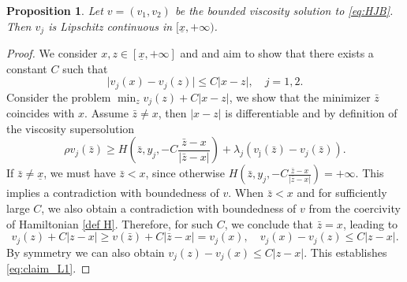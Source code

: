 \documentclass[11pt]{article}
\numberwithin{equation}{section}
\newtheorem{proposition}[theorem]{Proposition}
\theoremstyle{Claim}
\def\bjm{{\bar{\jmath}}}
\newcommand{\ux}{{\underline x}}
\theoremstyle{plain}
\begin{document}
\begin{proposition}\label{solution property}
Let $v=(v_1,v_2)$ be the bounded viscosity solution to  \eqref{eq:HJB}. Then $v_j$ is Lipschitz continuous in $[\ux,+\infty)$. 
	
\end{proposition}
\begin{proof}
We consider $x,z\in [\ux,+\infty]$ and and aim to show that there exists a constant \( C \) such that  
	\begin{equation}\label{eq:claim_L1}
		\vert v_j(x) -  v_j(z) \vert\leq C |x - z|,\quad j=1,2.
	\end{equation}
	Consider the problem $\min_{z}v_j(z)+C\vert x-z\vert$, we show that the minimizer $\bar{z}$ coincides with $x$. Assume $\bar{z}\neq x$, then $\vert x-z\vert$ is differentiable and by definition of the viscosity supersolution 
$$
	\rho v_j(\bar{z}) \geq H \left( \bar{z}, y_j, -C \frac{\bar{z} - x}{|\bar{z} - x|} \right)+\lambda_j(v_\bjm(\bar{z}) -v_j(\bar{z}) ).
$$	
	If \( \bar{z} \neq \underline{x} \), we must have \( \bar{z} < x \), since otherwise  	
	$
	H \left( \bar{z}, y_j, -C \frac{\bar{z} - x}{|\bar{z} - x|} \right) = +\infty.
	$	
	This implies a contradiction with boundedness of $v$. When $\bar{z} < x $ and for sufficiently large \( C \), we also obtain a contradiction with  boundedness of $v$ from the coercivity of Hamiltonian \eqref{def H}. Therefore, for such \( C \), we conclude that \( \bar{z} =x \), leading to  	
	$$
	v_j(z) + C |z - x| \geq v(\bar{z}) + C |\bar{z} - x| = v_j(x),\quad v_j(x)- v_j(z)\leq C |z - x|.
	$$
	By symmetry we can also obtain $v_j(z)- v_j(x)\leq C |z - x|$. This establishes \eqref{eq:claim_L1}. 
	\end{proof}
	
\end{document}
